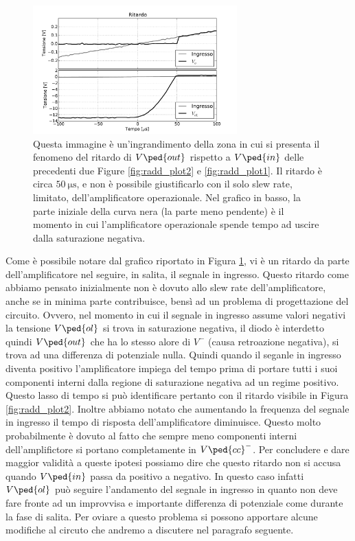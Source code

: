 \begin{figure}
        \centering
        \includegraphics[width=0.7\textwidth]{figure/rett_err.pdf}
        \caption{Questa immagine è un’ingrandimento della zona in cui si presenta il fenomeno del ritardo di $V\ped{out}$ rispetto a $V\ped{in}$ delle precedenti due Figure \ref{fig:radd_plot2} e \ref{fig:radd_plot1}. Il ritardo è circa $\SI{50}{\micro\second}$, e non è possibile giustificarlo con il solo slew rate, limitato, dell’amplificatore operazionale. Nel grafico in basso, la parte iniziale della curva nera (la parte meno pendente) è il momento in cui l’amplificatore operazionale spende tempo ad uscire dalla saturazione negativa.}
        \label{fig:radd_plot3}
\end{figure}

Come è possibile notare dal grafico riportato in Figura \ref{fig:radd_plot3}, vi è un ritardo da parte dell'amplificatore nel seguire, in salita, il segnale in ingresso. Questo ritardo come abbiamo pensato inizialmente non è dovuto allo slew rate dell'amplificatore, anche se in minima parte contribuisce, bensì ad un problema di progettazione del circuito.
Ovvero, nel momento in cui il segnale in ingresso assume valori negativi la tensione $V\ped{ol}$ si trova in saturazione negativa, il diodo è interdetto quindi $V\ped{out}$ che ha lo stesso alore di $V^-$ (causa retroazione negativa), si trova ad una differenza di potenziale nulla. Quindi quando il seganle in ingresso diventa positivo l'amplificatore impiega del tempo prima di portare tutti i suoi componenti interni dalla regione di saturazione negativa ad un regime positivo. Questo lasso di tempo si può identificare pertanto con il ritardo visibile in Figura \ref{fig:radd_plot2}. Inoltre abbiamo notato che aumentando la frequenza del segnale in ingresso il tempo di risposta dell'amplificatore diminuisce. Questo molto probabilmente è dovuto al fatto che sempre meno componenti interni dell'amplifictore si portano completamente in $V\ped{cc}^-$.
Per concludere e dare maggior validità a queste ipotesi possiamo dire che questo ritardo non si accusa quando $V\ped{in}$ passa da positivo a negativo. In questo caso infatti $V\ped{ol}$ può seguire l'andamento del segnale in ingresso in quanto non deve fare fronte ad un improvvisa e importante differenza di potenziale come durante la fase di salita. 
Per oviare a questo problema si possono apportare alcune modifiche al circuto che andremo a discutere nel paragrafo seguente.

